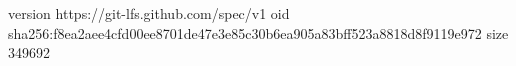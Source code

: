 version https://git-lfs.github.com/spec/v1
oid sha256:f8ea2aee4cfd00ee8701de47e3e85c30b6ea905a83bff523a8818d8f9119e972
size 349692
